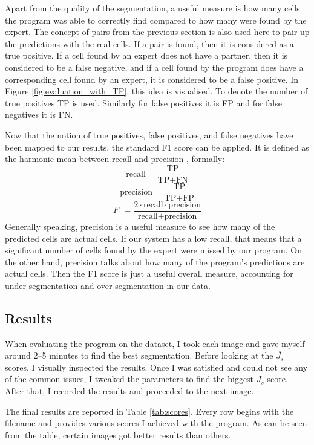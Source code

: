 \documentclass[
  digital,     %
  oneside,     %
  nosansbold,  %
  nocolorbold, %
  lof,         %
  lot,         %
]{fithesis4}
\begin{document}
Apart from the quality of the segmentation, a useful measure is how many cells
the program was able to correctly find compared to how many were found by the expert. The
concept of pairs from the previous section is also used here to pair up the
predictions with the real cells. If a pair is found, then it is considered as a
true positive. If a cell found by an expert does not have a partner, then it is
considered to be a false negative, and if a cell found by the program does have
a corresponding cell found by an expert, it is considered to be a false
positive. In Figure \ref{fig:evaluation_with_TP}, this idea is visualised. To denote the number of
true positives TP is used. Similarly for false positives it is FP and for false
negatives it is FN.

Now that the notion of true positives, false positives, and false negatives have
been mapped to our results, the standard F1 score can be applied. It is defined as
the harmonic mean between recall and precision \cite{sklearn-f1score}, formally:
$$\text{recall} = \frac{\text{TP}}{\text{TP} + \text{FN}}$$
$$\text{precision} = \frac{\text{TP}}{\text{TP} + \text{FP}}$$
$$F_1 = \frac{2 \cdot \text{recall} \cdot \text{precision}}{\text{recall} +
\text{precision}}$$
Generally speaking, precision is a useful measure to see how many of the predicted
cells are actual cells. If our system has a low recall, that means that a
significant number of cells found by the expert were missed by our program. On
the other hand, precision talks about how many of the program's predictions are actual
cells. Then the F1 score is just a useful overall measure, accounting for
under-segmentation and over-segmentation in our data.

\subsection{Results}
When evaluating the program on the dataset, I took each image and gave myself around 2--5
minutes to find the best segmentation. Before looking at the $\overline{J_s}$ scores, I
visually inspected the results. Once I was satisfied and could not see any of the common
issues, I tweaked the parameters to find the biggest $\overline{J_s}$ score.
After that, I recorded the results and proceeded to the next image.

The final results are reported in Table \ref{tab:scores}. Every row begins
with the filename and provides various scores I achieved with the
program. As can be seen from the table, certain images got better results than
others.
\end{document}
